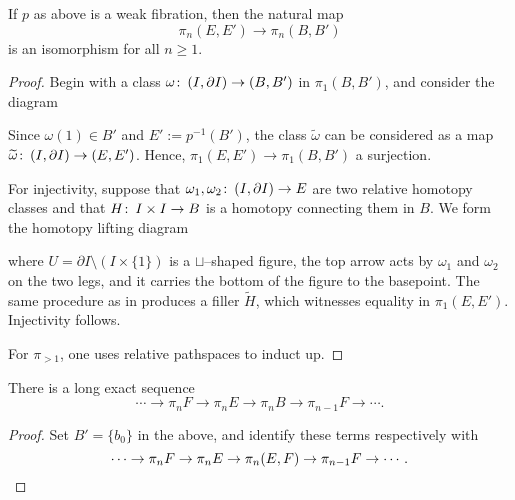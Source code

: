 \begin{corollary}
If $p$ as above is a weak fibration, then the natural map \[\pi_n(E, E') \to \pi_n(B, B')\] is an isomorphism for all $n \ge 1$.
\end{corollary}
\begin{proof}
Begin with a class $\omega \colon\thinspace (I, \partial I) \to (B, B')$ in $\pi_1(B, B')$, and consider the diagram
\begin{center}
\end{center}
Since $\omega(1) \in B'$ and $E' := p^{-1}(B')$, the class $\widetilde \omega$ can be considered as a map $\widetilde\omega\colon\thinspace (I, \partial I) \to (E, E')$.
Hence, $\pi_1(E, E') \to \pi_1(B, B')$ a surjection.

For injectivity, suppose that $\omega_1, \omega_2\colon\thinspace (I, \partial I) \to E$ are two relative homotopy classes and that $H\colon\thinspace I \times I \to B$ is a homotopy connecting them in $B$.
We form the homotopy lifting diagram
\begin{center}
\end{center}
where $U = \partial I \setminus (I \times \{1\})$ is a $\sqcup$--shaped figure, the top arrow acts by $\omega_1$ and $\omega_2$ on the two legs, and it carries the bottom of the figure to the basepoint.
The same procedure as in  produces a filler $\widetilde H$, which witnesses equality in $\pi_1(E, E')$.
Injectivity follows.

For $\pi_{> 1}$, one uses relative pathspaces to induct up.
\end{proof}

\begin{corollary}
There is a long exact sequence \[\cdots \to \pi_n F \to \pi_n E \to \pi_n B \to \pi_{n-1} F \to \cdots.\]
\end{corollary}
\begin{proof}
Set $B' = \{b_0\}$ in the above, and identify these terms respectively with \[\cdots \to \pi_n F \to \pi_n E \to \pi_n(E, F) \to \pi_{n-1} F \to \cdots. \qedhere\]
\end{proof}

